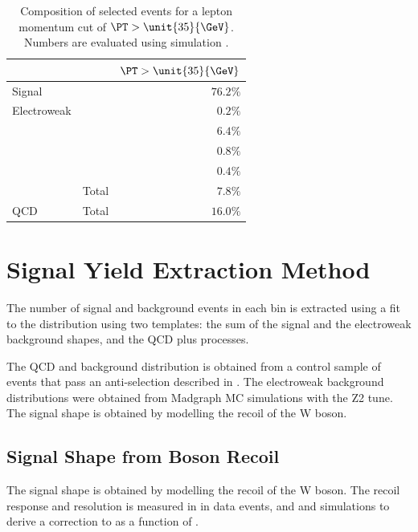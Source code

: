 \begin{table}[htbp]
\begin{center}
\begin{tabular}{llr}
    \toprule
& & $\PT>\unit{35}{\GeV}$\\
\midrule
Signal & \HepProcess{\PW\to\Pe\Pnu} & $76.2\%$ \\
Electroweak & \HepProcess{\PZ\to\Ptau\Ptau} & $0.2\%$  \\
    & \HepProcess{\PZ\to\Pe\Pe}     & $6.4\%$  \\
    & \HepProcess{\PW\to\Ptau\Pnu}  & $0.8\%$  \\
    & \HepProcess{\Ptop\APtop}      & $0.4\%$  \\
    & Total                         & $7.8\%$  \\
QCD & Total                         & $16.0\%$ \\
\bottomrule
\end{tabular}
\caption[Composition of selected events for a lepton momentum cut of
$\PT>\unit{35}{\GeV}$.] {Composition of selected events for a lepton momentum
cut of $\PT>\unit{35}{\GeV}$. Numbers are evaluated using simulation
\cite{bendavid2011electron}.}
\label{tab:updatedselectedcomp}
\end{center}
\end{table}

\section{Signal Yield Extraction Method}
The number of signal and background events in each bin is extracted using a fit
to the \ETm distribution using two templates: the sum of the \Wenu signal and
the {electroweak} background shapes, and the {QCD} plus \gjet processes.

The {QCD} and \gjet background distribution is obtained from a control sample of
events that pass an anti-selection described in .
The {electroweak} background \ETm distributions were obtained from Madgraph {MC}
simulations with the Z2 tune.
The signal \ETm shape is obtained by modelling the recoil of the W boson. 

\subsection{Signal \ETm Shape from Boson Recoil}
The signal \ETm shape is obtained by modelling the recoil of the W boson.  The
recoil response and resolution is measured in in \HepProcess{\PZ\to\Pe\Pe} data
events, and \PW and  simulations to derive a correction to \ETm as a
function of \PW \pT \cite{bauer2010modeling,alcaraz2010updated}.

